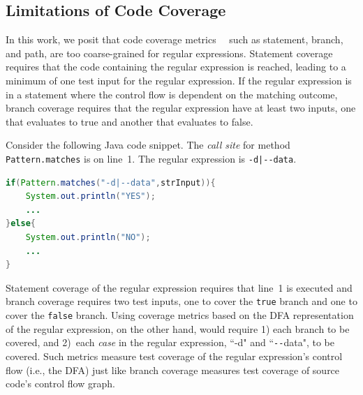 \subsection{Limitations of Code Coverage}
\label{codecoveragelimits}
In this work, we posit that code coverage metrics~\cite[Chapter~2]{ammann2016introduction}~\cite{zhu1997software,li2009experimental,piwowarski1993coverage} such as statement, branch, and path, are too coarse-grained for regular expressions. Statement coverage requires that the code containing the regular expression is reached, leading to a minimum of one test input for the regular expression. If the regular expression is in a statement where the control flow is dependent on the matching outcome, branch coverage requires that the regular expression have at least two inputs, one that evaluates to true and another that evaluates to false. 

Consider the following Java code snippet. The \emph{call site} for method {\tt Pattern.matches} is on line~1. The regular expression is \verb!-d|--data!. 

\vspace{-3pt}
\begin{lstlisting}[language=Java]
if(Pattern.matches("-d|--data",strInput)){
	System.out.println("YES");
	...	
}else{
	System.out.println("NO");
	...
}
\end{lstlisting}
\vspace{-3pt}
Statement coverage of the regular expression  requires that line~1 is executed and branch coverage  requires two test inputs, one to cover the {\tt true} branch and one to cover the {\tt false} branch. 
Using coverage metrics based on the DFA representation of the regular expression, on the other hand, 
 would require 1) each branch to be covered, and 2)~each \emph{case} in the regular expression, ``-d" and ``\verb!--!data", to be covered. 
Such metrics measure test coverage of the regular expression's control flow (i.e., the DFA) just like branch coverage measures test coverage of source code's control flow graph.

